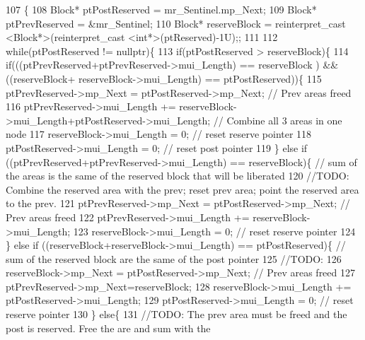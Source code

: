 \begin{DoxyCode}
107                                    \{
108     Block* ptPostReserved = mr\_Sentinel.mp\_Next;
109     Block* ptPrevReserved = &mr\_Sentinel;
110     Block* reserveBlock = reinterpret\_cast <Block*>(reinterpret\_cast <\textcolor{keywordtype}{int}*>(ptReserved)-1U);;
111 
112     \textcolor{keywordflow}{while}(ptPostReserved != \textcolor{keyword}{nullptr})\{
113         \textcolor{keywordflow}{if}(ptPostReserved > reserveBlock)\{
114             \textcolor{keywordflow}{if}(((ptPrevReserved+ptPrevReserved->mui\_Length) == reserveBlock ) && ((reserveBlock+
      reserveBlock->mui\_Length) == ptPostReserved))\{
115                 ptPrevReserved->mp\_Next = ptPostReserved->mp\_Next; \textcolor{comment}{// Prev areas freed}
116                 ptPrevReserved->mui\_Length += reserveBlock->mui\_Length+ptPostReserved->mui\_Length; \textcolor{comment}{//
       Combine all 3 areas in one node}
117                 reserveBlock->mui\_Length = 0; \textcolor{comment}{// reset reserve pointer}
118                 ptPostReserved->mui\_Length = 0; \textcolor{comment}{// reset post pointer}
119             \} \textcolor{keywordflow}{else} \textcolor{keywordflow}{if} ((ptPrevReserved+ptPrevReserved->mui\_Length) == reserveBlock)\{ \textcolor{comment}{// sum of the areas is
       the same of the reserved block that will be liberated}
120                 \textcolor{comment}{//TODO: Combine the reserved area with the prev; reset prev area; point the reserved area
       to the prev.}
121                 ptPrevReserved->mp\_Next = ptPostReserved->mp\_Next; \textcolor{comment}{// Prev areas freed}
122                 ptPrevReserved->mui\_Length += reserveBlock->mui\_Length;
123                 reserveBlock->mui\_Length = 0; \textcolor{comment}{// reset reserve pointer}
124             \} \textcolor{keywordflow}{else} \textcolor{keywordflow}{if} ((reserveBlock+reserveBlock->mui\_Length) == ptPostReserved)\{ \textcolor{comment}{// sum of the reserved
       block are the same of the post pointer}
125                 \textcolor{comment}{//TODO:}
126                 reserveBlock->mp\_Next = ptPostReserved->mp\_Next; \textcolor{comment}{// Prev areas freed}
127                 ptPrevReserved->mp\_Next=reserveBlock;
128                 reserveBlock->mui\_Length += ptPostReserved->mui\_Length;
129                 ptPostReserved->mui\_Length = 0; \textcolor{comment}{// reset reserve pointer}
130             \} \textcolor{keywordflow}{else}\{
131                 \textcolor{comment}{//TODO: The prev area must be freed and the post is reserved. Free the are and sum with the
}
\end{DoxyCode}
